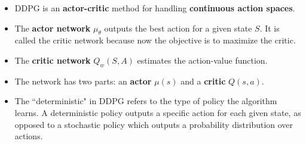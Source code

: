 \documentclass[12pt]{article}
\begin{document}
\begin{itemize}
    \item DDPG is an \textbf{actor-critic} method for handling \textbf{continuous action spaces}.
    \item The \textbf{actor network} $\mu_\theta$ outputs the best action for a given state $S$. It is called the critic network because now the objective is to maximize the critic. 
    \item The \textbf{critic network} $Q_w(S,A)$ estimates the action-value function.
    \item The network has two parts: an \textbf{actor} $\mu(s)$ and a \textbf{critic} $Q(s,a)$.
    \item The ``deterministic" in DDPG refers to the type of policy the algorithm learns. A deterministic policy outputs a specific action for each given state, as opposed to a stochastic policy which outputs a probability distribution over actions.
\end{itemize}
\end{document}
